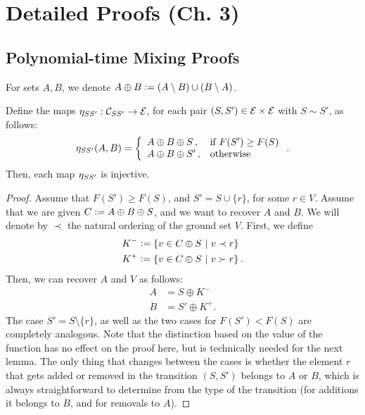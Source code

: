 \chapter{Detailed Proofs (Ch. 3)}

\section{Polynomial-time Mixing Proofs}
For sets $A, B$, we denote $A \oplus B \defeq (A \setminus B)\cup(B \setminus A)$.

\let\oldthelemma\thelemma
\renewcommand{\thelemma}{A.1}
\begin{lemma} \label{lem:inj}
Define the maps $\ess : \mathcal{C}_{SS'} \to \ss$, for each pair $(S, S') \in \ss \times \ss$ with $S \sim S'$, as follows:
\begin{align*}
  \ess(A, B) = \twopartdefo{A \oplus B \oplus S}{F(S') \geq F(S)}{A \oplus B \oplus S'}.
\end{align*}
Then, each map $\ess$ is injective.
\end{lemma}

\begin{proof}
  Assume that $F(S') \geq F(S)$, and $S' = S \cup \{r\}$, for some $r \in V$.
  Assume that we are given $C \defeq A \oplus B \oplus S$, and we want to recover $A$ and $B$.
  We will denote by $\prec$ the natural ordering of the ground set $V$.
  First, we define
  \begin{align*}
    K^- &\defeq \sdef{v \in C \oplus S}{v \prec r}\\
    K^+ &\defeq \sdef{v \in C \oplus S}{v \succ r}.
  \end{align*}
  Then, we can recover $A$ and $V$ as follows:
  \begin{align*}
    A &= S \oplus K^-\\
    B &= S' \oplus K^+.
  \end{align*}
  The case $S' = S \setminus \{r\}$, as well as the two cases for $F(S') < F(S)$ are completely analogous.
  Note that the distinction based on the value of the function has no effect on the proof here, but is technically needed for the next lemma.
  The only thing that changes between the cases is whether the element $r$ that gets added or removed in the transition $(S, S')$ belongs to $A$ or $B$, which is always straightforward to determine from the type of the transition (for additions it belongs to $B$, and for removals to $A$).
\end{proof}
\let\thelemma\oldthelemma

